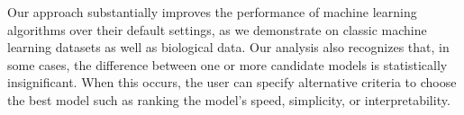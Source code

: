 Our approach substantially improves the performance of machine learning algorithms over their default settings, as we demonstrate on classic machine learning datasets as well as biological data. Our analysis also recognizes that, in some cases, the difference between one or more candidate models is statistically insignificant. When this occurs, the user can specify alternative criteria to choose the best model such as ranking the model's speed, simplicity, or interpretability.




